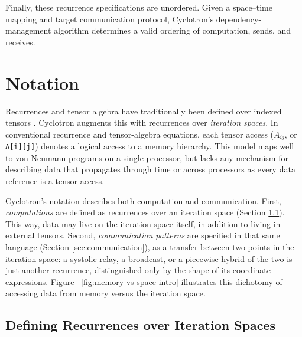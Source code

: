 \documentclass[sigplan, nonacm]{acmart}
\begin{document}
Finally, these recurrence specifications are unordered. Given a space--time mapping and target communication protocol, 
Cyclotron's dependency-management algorithm determines a valid ordering of computation, 
sends, and receives.



\section{Notation}
\label{sec:notation}



Recurrences and tensor algebra have traditionally been defined over indexed
tensors \citep{recuma, reptile, vinaithirthan2026compiling, kjolstad2017taco}. Cyclotron augments this with recurrences over \emph{iteration spaces}.
In conventional recurrence and tensor-algebra equations, each tensor
access ($A_{ij}$, or \texttt{A[i][j]}) denotes a logical access to a memory
hierarchy. This model maps well to von Neumann programs on a
single processor, but lacks any mechanism for describing data
that propagates through time or across processors as every data reference is a
tensor access.

Cyclotron's notation describes both computation and communication. First,
\emph{computations} are defined as recurrences over an iteration space
(Section \ref{sec:recurrences}). This way, data may live on the iteration space itself, in addition to living in external tensors. Second, \emph{communication patterns} are specified
in that same language (Section \ref{sec:communication}), as a transfer between two points in the iteration space: a systolic relay, a
broadcast, or a piecewise hybrid of the two is just another recurrence,
distinguished only by the shape of its coordinate expressions. Figure ~\ref{fig:memory-vs-space-intro} illustrates this dichotomy of accessing data from memory versus the iteration space.

\subsection{Defining Recurrences over Iteration Spaces}
\label{sec:recurrences}
\end{document}
